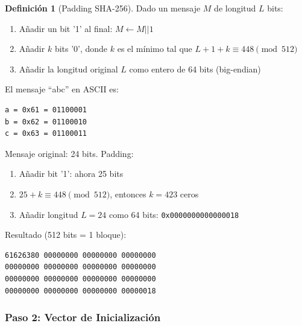 \documentclass[11pt,a4paper,twoside,openright]{book}
\theoremstyle{definition}
\newtheorem{definition}{Definición}[chapter]
\theoremstyle{plain}
\theoremstyle{remark}
\begin{document}
\begin{definition}[Padding SHA-256]
Dado un mensaje $M$ de longitud $L$ bits:
\begin{enumerate}
    \item Añadir un bit '1' al final: $M \leftarrow M || 1$
    \item Añadir $k$ bits '0', donde $k$ es el mínimo tal que $L + 1 + k \equiv 448 \pmod{512}$
    \item Añadir la longitud original $L$ como entero de 64 bits (big-endian)
\end{enumerate}
\end{definition}

\begin{ejemplo}
El mensaje ``abc'' en ASCII es:
\begin{verbatim}
a = 0x61 = 01100001
b = 0x62 = 01100010  
c = 0x63 = 01100011
\end{verbatim}

Mensaje original: 24 bits. Padding:
\begin{enumerate}
    \item Añadir bit '1': ahora 25 bits
    \item $25 + k \equiv 448 \pmod{512}$, entonces $k = 423$ ceros
    \item Añadir longitud $L = 24$ como 64 bits: \texttt{0x0000000000000018}
\end{enumerate}

Resultado (512 bits = 1 bloque):
\begin{verbatim}
61626380 00000000 00000000 00000000
00000000 00000000 00000000 00000000
00000000 00000000 00000000 00000000
00000000 00000000 00000000 00000018
\end{verbatim}
\end{ejemplo}

\subsubsection{Paso 2: Vector de Inicialización}
\end{document}
